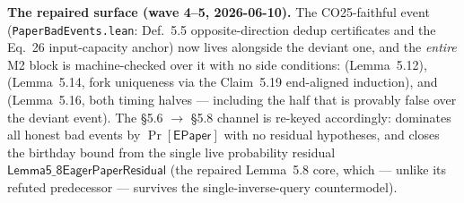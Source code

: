 \begin{remark}
    \textbf{The repaired surface (wave 4--5, 2026-06-10).} The CO25-faithful event
     (\texttt{PaperBadEvents.lean}: Def.~5.5
    opposite-direction dedup certificates and the Eq.~26 input-capacity anchor) now lives
    alongside the deviant one, and the \emph{entire} M2 block is machine-checked over it
    with no side conditions:  (Lemma~5.12),
     (Lemma~5.14, fork uniqueness via the
    Claim~5.19 end-aligned induction), and 
    (Lemma~5.16, both timing halves — including the half that is provably false over the
    deviant event). The \S5.6 $\to$ \S5.8 channel is re-keyed accordingly:
    dominates all honest bad events by $\Pr[\mathsf{EPaper}]$ with no residual
    hypotheses, and
     closes
    the birthday bound from the single live probability residual
    $\mathsf{Lemma5\_8EagerPaperResidual}$ (the repaired Lemma~5.8 core, which — unlike
    its refuted predecessor — survives the single-inverse-query countermodel).


\end{remark}
